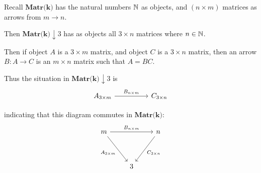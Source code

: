 \documentclass[12pt]{letter}
\begin{document}
\begin{example}

Recall $\textbf{Matr(k)}$ has the natural numbers $\mathbb{N}$ as objects, and $(n\times m)$ matrices as arrows from $m \to n$.

Then $\textbf{Matr(k)} \downarrow 3$ has as objects all $3\times n$ matrices where $n \in \mathbb{N}$.

Then if object $A$ is a $3\times m$ matrix, and object $C$ is a $3\times n$ matrix,
then an arrow $B : A \to C$ is an $m \times n$ matrix such that $A=BC$.

Thus the situation in $\textbf{Matr(k)} \downarrow 3$ is
\[\begin{tikzcd}
    {A_{3\times m}} && {C_{3\times n}}
    \arrow["{B_{n\times m}}", from=1-1, to=1-3]
\end{tikzcd}\]

indicating that this diagram commutes in $\textbf{Matr(k)}$:
\[\begin{tikzcd}
    {m} && {n} \\
    \\
    & {3}
    \arrow["{A_{3\times m}}"', from=1-1, to=3-2]
    \arrow["{C_{3\times n}}", from=1-3, to=3-2]
    \arrow["{B_{n\times m}}", from=1-1, to=1-3]
\end{tikzcd}\]

\end{example}
\end{document}
